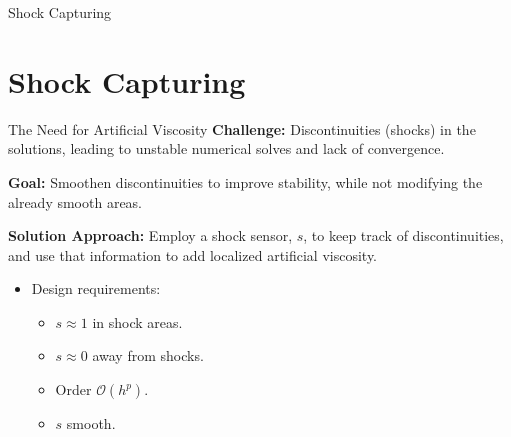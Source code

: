 \documentclass{beamer}
\newcounter{sectionframes}
\newcommand{\setsectionframes}[1]{%
  \setcounter{sectionframes}{#1}%
}
\newcounter{sectionframecount}
\begin{document}
\begin{frame}[plain]
  \vfill
  \centering
  {Shock Capturing}
  \vfill
\end{frame}


\section{Shock Capturing}

\setsectionframes{6}


\begin{frame}[t]{The Need for Artificial Viscosity}
\textbf{Challenge:} Discontinuities (shocks) in the solutions, leading to unstable
numerical solves and lack of convergence.

\vspace{20pt}
\textbf{Goal:} Smoothen discontinuities to improve stability, while not modifying
the already smooth areas.

\vspace{20pt}
\textbf{Solution Approach:} Employ a shock sensor, $s$, to keep track of discontinuities, and use that information to add localized artificial viscosity.

\vspace{8pt}
\begin{itemize}
  \item Design requirements:
  \begin{itemize}
    \item $s \approx 1$ in shock areas.
    \item $s \approx 0$ away from shocks.
    \item Order $\mathcal{O}(h^p)$.
    \item $s$ smooth.
  \end{itemize}
\end{itemize}

\end{frame}

\end{document}
